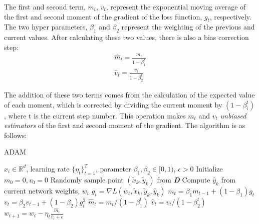 The first and second term, $m_{t}$, $v_t$, represent the exponential moving average of the first and second moment of the gradient of the loss function, $g_t$, respectively. The two hyper parameters, $\beta_1$ and $\beta_2$ represent the weighting of the previous and current values. After calculating these two values, there is also a bias correction step:
\begin{align*}
\hat{m}_{t}=\frac{m_t}{1-\beta_1^t} \\
\hat{v}_{t}=\frac{v_t}{1-\beta_2^t}
\end{align*}
\vspace{-10pt}

The addition of these two terms comes from the calculation of the expected value of each moment, which is corrected by dividing the current moment by $(1 - \beta_i^t)$, where t is the current step number. This operation makes $m_t$ and $v_t$ \textit{unbiased estimators} of the first and second moment of the gradient. The algorithm is as follows:
\begin{minipage}[b]{.48\textwidth}
\begin{algorithm}[H]\small
	\caption{ADAM \cite{adam}}
	\label{alg:adam}
	\begin{algorithmic}
		 $x_i \in \mathbb{R}^d$, learning rate $\{\eta_t\}_{t=1}^T$, parameter $\beta_{1},\beta_{2} \in [0,1)$,  $\epsilon > 0$
		\STATE Initialize $m_{0} = 0, v_{0} = 0$
		\vspace{2pt}
		\STATE Randomly sample point $(\tilde x_k,\tilde y_k)$ from \textbf{\textit{D}}
		\vspace{2pt}
		\STATE Compute $\hat y_k$ from current network weights, $w_t$
		\vspace{2pt}
		\STATE $g_{t} = \nabla L(w_t,\tilde x_{k},\tilde y_k,\hat y_k)$
		\vspace{2pt}
        \STATE $m_{t} = \beta_{1}m_{t-1}+(1-\beta_{1})g_{t}$
        \vspace{2pt}
        \STATE $v_{t} = \beta_{2}v_{t-1}+(1-\beta_{2})g_{t}^2$
        \vspace{2pt}
        \STATE $\hat{m}_{t}={m_t}/(1-\beta_1^t)$
        \vspace{2pt}
        \STATE $\hat{v}_{t}={v_t}/(1-\beta_2^t)$
        \vspace{2pt}
        \STATE $w_{t+1} = w_{t}-\eta_t\frac{\hat{m}_t}{\hat{v}_t+\epsilon}$
        \vspace{2pt}
		\ENDFOR
	\end{algorithmic}
\end{algorithm}
\end{minipage}\hfill%


